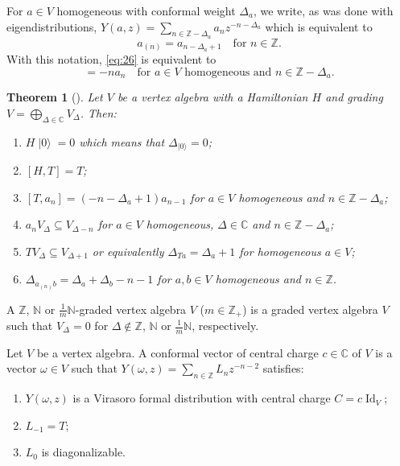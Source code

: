 \documentclass[a4paper, 12pt, reqno]{amsart}
\newtheorem{theorem}{Theorem}[subsection]
\theoremstyle{remark}
\numberwithin{equation}{subsection}
\DeclareMathOperator{\Id}{Id}
\DeclareMathOperator{\vac}{|0\rangle}
\begin{document}
For $a \in V$ homogeneous with conformal weight $\Delta_a$, we write, as was done with eigendistributions, $Y(a,z) = \sum_{n \in \mathbb{Z} - \Delta_a}a_nz^{-n - \Delta_a}$ which is equivalent to
\begin{equation*}
  a_{(n)} = a_{n - \Delta_a + 1} \quad \text{for }n \in \mathbb{Z}.
\end{equation*}
With this notation, \eqref{eq:26} is equivalent to
\begin{equation*}
  [H, a_n] = -na_n \quad \text{for } a \in V\text{ homogeneous and }n \in \mathbb{Z} - \Delta_a.
\end{equation*}

\begin{theorem}[{\cite[\S4.9]{kac_vertex_1998}}]
  \label{thr:17}
  Let $V$ be a vertex algebra with a Hamiltonian $H$ and grading $V = \bigoplus_{\Delta \in \mathbb{C}}V_{\Delta}$.
  Then:
  \begin{enumerate}
  \item $H\vac = 0$ which means that $\Delta_{\vac} = 0$;
  \item $[H, T] = T$;
  \item $[T, a_n] = (-n - \Delta_a + 1)a_{n - 1}$ for $a \in V$ homogeneous and $n \in \mathbb{Z} - \Delta_a$;
  \item $a_nV_{\Delta} \subseteq V_{\Delta - n}$ for $a \in V$ homogeneous, $\Delta \in \mathbb{C}$ and $n \in \mathbb{Z} - \Delta_a$;
  \item $TV_\Delta \subseteq V_{\Delta + 1}$ or equivalently $\Delta_{Ta} = \Delta_a + 1$ for homogeneous $a \in V$;
  \item $\Delta_{a_{(n)}b} = \Delta_a + \Delta_b - n - 1$ for $a, b \in V$ homogeneous and $n \in \mathbb{Z}$.
  \end{enumerate}
\end{theorem}

A $\mathbb{Z}$, $\mathbb{N}$ or $\frac{1}{m}\mathbb{N}$-graded vertex algebra $V$ ($m \in \mathbb{Z}_+$) is a graded vertex algebra $V$ such that $V_{\Delta} = 0$ for $\Delta \notin \mathbb{Z}$, $\mathbb{N}$ or $\frac{1}{m}\mathbb{N}$, respectively.

Let $V$ be a vertex algebra.
A conformal vector of central charge $c \in \mathbb{C}$ of $V$ is a vector $\omega \in V$ such that $Y(\omega, z) = \sum_{n \in \mathbb{Z}}L_nz^{-n - 2}$ satisfies:
\begin{enumerate}
\item $Y(\omega, z)$ is a Virasoro formal distribution with central charge $C = c\Id_V$;
\item $L_{-1} = T$;
\item $L_0$ is diagonalizable. 
\end{enumerate}
\end{document}

